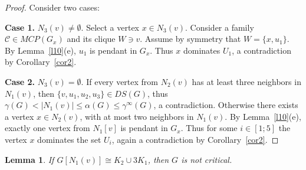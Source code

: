 \documentclass[12pt]{article}
\newtheorem{lemma}{Lemma}
\begin{document}
\begin{proof}

Consider two cases:

\textbf{Case 1.} $N_3(v) \neq \emptyset$. Select a vertex $x \in N_3(v)$. Consider a family $\mathcal{C} \in MCP(G_x)$ and its clique $W \ni v$. Assume by symmetry that $W = \{x,u_1\}$. By Lemma~\ref{l10}(e), $u_1$ is pendant in $G_x$. Thus $x$ dominates $U_1$, a contradiction by Corollary~\ref{cor2}. 

\textbf{Case 2.} $N_3(v) = \emptyset$. If every vertex from $N_2(v)$ has at least three neighbors in $N_1(v)$, then $\{v,u_1,u_2,u_3\} \in DS(G)$, thus $\gamma(G) < |N_1(v)| \leq \alpha(G)\leq \gamma^{\infty}(G)$, a contradiction. Otherwise there exists a vertex $x \in N_2(v)$, with at most two neighbors in $N_1(v)$. By Lemma~\ref{l10}(e), exactly one vertex from $N_1[v]$ is pendant in $G_x$. Thus for some $i \in [1;5]$ the vertex $x$ dominates the set $U_i$, again a contradiction by Corollary~\ref{cor2}.
\end{proof}

\begin{lemma}\label{l35}
If $G[N_1(v)] \cong K_2 \cup 3K_1$, then $G$ is not critical.
\end{lemma}
\end{document}
